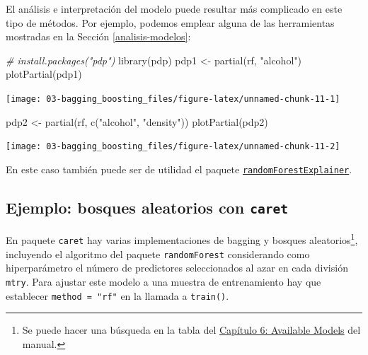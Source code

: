 \documentclass[
]{book}
\newenvironment{Shaded}{\begin{snugshade}}{\end{snugshade}}
\newcommand{\CommentTok}[1]{\textcolor[rgb]{0.56,0.35,0.01}{\textit{#1}}}
\newcommand{\FunctionTok}[1]{\textcolor[rgb]{0.00,0.00,0.00}{#1}}
\newcommand{\NormalTok}[1]{#1}
\newcommand{\OtherTok}[1]{\textcolor[rgb]{0.56,0.35,0.01}{#1}}
\newcommand{\StringTok}[1]{\textcolor[rgb]{0.31,0.60,0.02}{#1}}
\theoremstyle{break}
\theoremstyle{definition}
\theoremstyle{definition}
\theoremstyle{definition}
\theoremstyle{definition}
\theoremstyle{remark}
\begin{document}
El análisis e interpretación del modelo puede resultar más complicado en este tipo de métodos.
Por ejemplo, podemos emplear alguna de las herramientas mostradas en la Sección \ref{analisis-modelos}:

\begin{Shaded}
\begin{Highlighting}[]
\CommentTok{\# install.packages("pdp")}
\FunctionTok{library}\NormalTok{(pdp)}
\NormalTok{pdp1 }\OtherTok{\textless{}{-}} \FunctionTok{partial}\NormalTok{(rf, }\StringTok{"alcohol"}\NormalTok{)}
\FunctionTok{plotPartial}\NormalTok{(pdp1)}
\end{Highlighting}
\end{Shaded}

\begin{center}\texttt{[image: 03-bagging\_boosting\_files/figure-latex/unnamed-chunk-11-1]} \end{center}

\begin{Shaded}
\begin{Highlighting}[]
\NormalTok{pdp2 }\OtherTok{\textless{}{-}} \FunctionTok{partial}\NormalTok{(rf, }\FunctionTok{c}\NormalTok{(}\StringTok{"alcohol"}\NormalTok{, }\StringTok{"density"}\NormalTok{))}
\FunctionTok{plotPartial}\NormalTok{(pdp2)}
\end{Highlighting}
\end{Shaded}

\begin{center}\texttt{[image: 03-bagging\_boosting\_files/figure-latex/unnamed-chunk-11-2]} \end{center}

En este caso también puede ser de utilidad el paquete \href{https://modeloriented.github.io/randomForestExplainer}{\texttt{randomForestExplainer}}.

\hypertarget{ejemplo-bosques-aleatorios-con-caret}{%
\subsection{\texorpdfstring{Ejemplo: bosques aleatorios con \texttt{caret}}{Ejemplo: bosques aleatorios con caret}}\label{ejemplo-bosques-aleatorios-con-caret}}

En paquete \texttt{caret} hay varias implementaciones de bagging y bosques aleatorios\footnote{Se puede hacer una búsqueda en la tabla del \href{https://topepo.github.io/caret/available-models.html}{Capítulo 6: Available Models} del manual.}, incluyendo el algoritmo del paquete \texttt{randomForest} considerando como hiperparámetro el número de predictores seleccionados al azar en cada división \texttt{mtry}.
Para ajustar este modelo a una muestra de entrenamiento hay que establecer \texttt{method\ =\ "rf"} en la llamada a \texttt{train()}.
\end{document}
